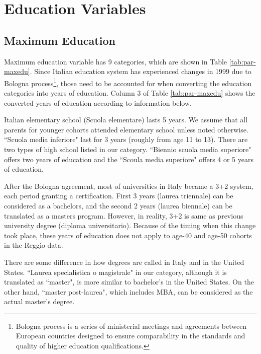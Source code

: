 \section{Education Variables}
\label{sec:edu}
\subsection{Maximum Education}

Maximum education variable has 9 categories, which are shown in Table \ref{tab:par-maxedu}. Since Italian education system has experienced changes in 1999 due to Bologna process\footnote{Bologna process is a series of ministerial meetings and agreements between European countries designed to ensure comparability in the standards and quality of higher education qualifications.}, those need to be accounted for when converting the education categories into years of education. Column 3 of Table \ref{tab:par-maxedu} shows the converted years of education according to information below. 

Italian elementary school (Scuola elementare) lasts 5 years. We assume that all parents for younger cohorts attended elementary school unless noted otherwise. ``Scuola media inferiore" last for 3 years (roughly from age 11 to 13). There are two types of high school listed in our category. ``Biennio scuola media superiore" offers two years of education and the ``Scoula media superiore" offers 4 or 5 years of education. 

After the Bologna agreement, most of universities in Italy became a 3+2 system, each period granting a certification. First 3 years (laurea triennale) can be considered as a bachelors, and the second 2 years (laurea biennale) can be translated as a masters program. However, in reality, 3+2 is same as previous university degree (diploma universitario). Because of the timing when this change took place, these years of education does not apply to age-40 and age-50 cohorts in the Reggio data. 

There are some difference in how degrees are called in Italy and in the United States. ``Laurea specialistica o magistrale" in our category, although it is translated as ``master", is more similar to bachelor's in the United States. On the other hand, ``master post-laurea", which includes MBA, can be considered as the actual master's degree. 


